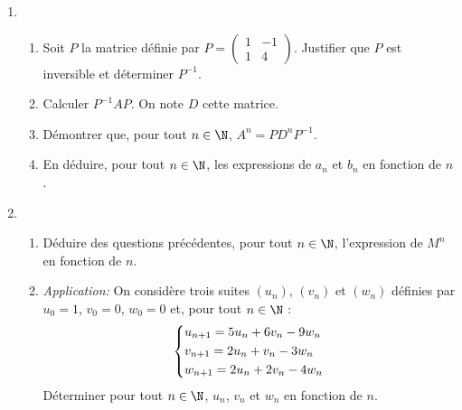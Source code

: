 \documentclass[a4paper]{article}
\begin{document}
\begin{exercice}{}{}
\begin{enumerate}
    \item \begin{enumerate}
        \item Soit $P$ la matrice définie par $P = \begin{pmatrix} 1 & -1 \\ 1 & 4 \end{pmatrix}$. Justifier que $P$ est inversible et déterminer $P^{-1}$.
        \item Calculer $P^{-1}AP$. On note $D$ cette matrice.
        \item Démontrer que, pour tout $n\in\N$, $A^n=PD^nP^{-1}$.
        \item En déduire, pour tout $n\in\N$, les expressions de $a_n$ et $b_n$ en fonction de $n$.
    \end{enumerate}    
    
    
    \item \begin{enumerate}
        \item Déduire des questions précédentes, pour tout $n\in\N$, l'expression de $M^n$ en fonction de $n$.
        \item \textit{Application:} On considère trois suites $(u_n)$, $(v_n)$ et $(w_n)$ définies par $u_0=1$, $v_0=0$, $w_0=0$ et, pour tout $n\in\N$ :
        $$\begin{dcases}
            u_{n+1}=5u_n+6v_n-9w_n\\
            v_{n+1}=2u_n+v_n-3w_n\\
            w_{n+1}=2u_n+2v_n-4w_n\\
        \end{dcases}$$
        Déterminer pour tout $n\in\N$, $u_n$, $v_n$ et $w_n$ en fonction de $n$.
    \end{enumerate}
\end{enumerate}

\end{exercice}
\end{document}
